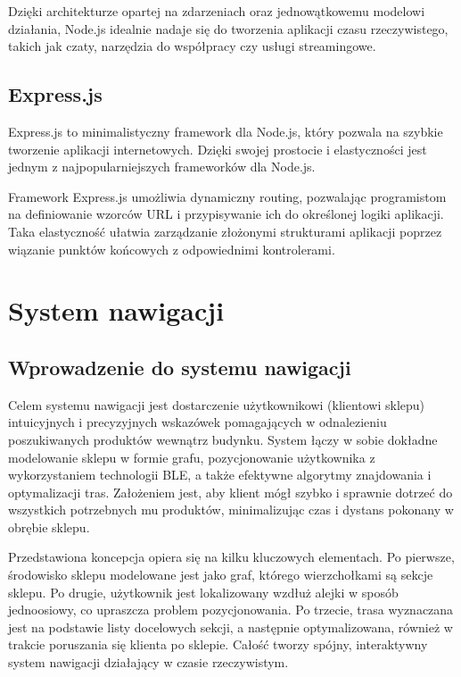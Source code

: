Dzięki architekturze opartej na zdarzeniach oraz jednowątkowemu modelowi działania, Node.js idealnie nadaje się do tworzenia aplikacji czasu rzeczywistego, takich jak czaty, narzędzia do współpracy czy usługi streamingowe. \cite{peters2017building}

\subsection{Express.js}
Express.js to minimalistyczny framework dla Node.js, który pozwala na szybkie tworzenie aplikacji internetowych. Dzięki swojej prostocie i elastyczności jest jednym z najpopularniejszych frameworków dla Node.js.

Framework Express.js umożliwia dynamiczny routing, pozwalając programistom na definiowanie wzorców URL i przypisywanie ich do określonej logiki aplikacji. Taka elastyczność ułatwia zarządzanie złożonymi strukturami aplikacji poprzez wiązanie punktów końcowych z odpowiednimi kontrolerami. \cite{peters2017building}

\section{System nawigacji}

\subsection{Wprowadzenie do systemu nawigacji}
Celem systemu nawigacji jest dostarczenie użytkownikowi (klientowi sklepu) intuicyjnych i precyzyjnych wskazówek pomagających w odnalezieniu poszukiwanych produktów wewnątrz budynku. System łączy w sobie dokładne modelowanie sklepu w formie grafu, pozycjonowanie użytkownika z wykorzystaniem technologii BLE, a także efektywne algorytmy znajdowania i optymalizacji tras. Założeniem jest, aby klient mógł szybko i sprawnie dotrzeć do wszystkich potrzebnych mu produktów, minimalizując czas i dystans pokonany w obrębie sklepu.

Przedstawiona koncepcja opiera się na kilku kluczowych elementach. Po pierwsze, środowisko sklepu modelowane jest jako graf, którego wierzchołkami są sekcje sklepu. Po drugie, użytkownik jest lokalizowany wzdłuż alejki w sposób jednoosiowy, co upraszcza problem pozycjonowania. Po trzecie, trasa wyznaczana jest na podstawie listy docelowych sekcji, a następnie optymalizowana, również w trakcie poruszania się klienta po sklepie. Całość tworzy spójny, interaktywny system nawigacji działający w czasie rzeczywistym.

